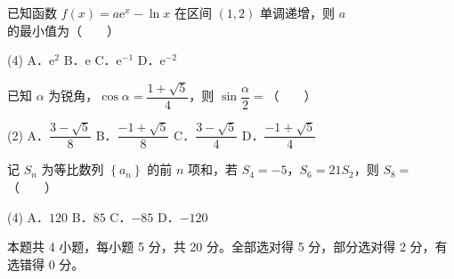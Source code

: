 \begin{question}
已知函数 $f(x)=a\mathrm e^{x}-\ln x$ 在区间 $(1,2)$ 单调递增，则 $a$ 的最小值为\mbox{（　　）}

\begin{gkopts}(4)
\task A．$\mathrm e^{2}$
\task B．$\mathrm e$
\task C．$\mathrm e^{-1}$
\task D．$\mathrm e^{-2}$
\end{gkopts}

\end{question}
\begin{question}
已知 $\alpha$ 为锐角，$\cos\alpha=\dfrac{1+\sqrt5}4$，则 $\sin\dfrac\alpha2=$\mbox{（　　）}

\begin{gkopts}(2)
\task A．$\dfrac{3-\sqrt5}8$
\task B．$\dfrac{-1+\sqrt5}8$
\task C．$\dfrac{3-\sqrt5}4$
\task D．$\dfrac{-1+\sqrt5}4$
\end{gkopts}

\end{question}
\begin{question}
记 $S_n$ 为等比数列 $\left\{a_n\right\}$ 的前 $n$ 项和，若 $S_4=-5$，$S_6=21S_2$，则 $S_8=$\mbox{（　　）}

\begin{gkopts}(4)
\task A．$120$
\task B．$85$
\task C．$-85$
\task D．$-120$
\end{gkopts}

\par\medskip

\end{question}

\begin{gktip}
本题共 4 小题，每小题 5 分，共 20 分。全部选对得 5 分，部分选对得 2 分，有选错得 0 分。
\end{gktip}

